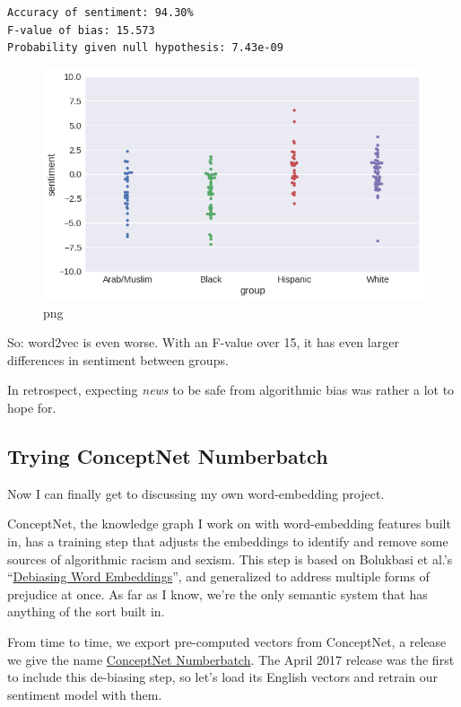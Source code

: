 \documentclass[]{book}
\theoremstyle{definition}
\theoremstyle{definition}
\theoremstyle{definition}
\theoremstyle{remark}
\begin{document}
\begin{verbatim}
Accuracy of sentiment: 94.30%
F-value of bias: 15.573
Probability given null hypothesis: 7.43e-09
\end{verbatim}

\begin{figure}
\centering
\includegraphics{how-to-make-a-racist-ai-without-really-trying_files/how-to-make-a-racist-ai-without-really-trying_61_1.png}
\caption{png}
\end{figure}

So: word2vec is even worse. With an F-value over 15, it has even larger
differences in sentiment between groups.

In retrospect, expecting \emph{news} to be safe from algorithmic bias
was rather a lot to hope for.

\subsection{Trying ConceptNet
Numberbatch}\label{trying-conceptnet-numberbatch}

Now I can finally get to discussing my own word-embedding project.

ConceptNet, the knowledge graph I work on with word-embedding features
built in, has a training step that adjusts the embeddings to identify
and remove some sources of algorithmic racism and sexism. This step is
based on Bolukbasi et al.'s
``\href{https://arxiv.org/abs/1607.06520}{Debiasing Word Embeddings}'',
and generalized to address multiple forms of prejudice at once. As far
as I know, we're the only semantic system that has anything of the sort
built in.

From time to time, we export pre-computed vectors from ConceptNet, a
release we give the name
\href{https://github.com/commonsense/conceptnet-numberbatch}{ConceptNet
Numberbatch}. The April 2017 release was the first to include this
de-biasing step, so let's load its English vectors and retrain our
sentiment model with them.
\end{document}
